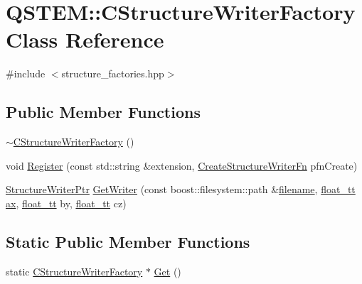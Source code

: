\hypertarget{class_q_s_t_e_m_1_1_c_structure_writer_factory}{\section{Q\-S\-T\-E\-M\-:\-:C\-Structure\-Writer\-Factory Class Reference}
\label{class_q_s_t_e_m_1_1_c_structure_writer_factory}
}


{\ttfamily \#include $<$structure\-\_\-factories.\-hpp$>$}

\subsection*{Public Member Functions}
\begin{DoxyCompactItemize}
\item 
\hyperlink{class_q_s_t_e_m_1_1_c_structure_writer_factory_aabc542066e3b68fdd08f8a4c9e3b9f5f}{$\sim$\-C\-Structure\-Writer\-Factory} ()
\item 
void \hyperlink{class_q_s_t_e_m_1_1_c_structure_writer_factory_a2e5f3cba95019c6fffe68e8e939c285b}{Register} (const std\-::string \&extension, \hyperlink{namespace_q_s_t_e_m_a410415444cab11e6e82ba838bacc0ca4}{Create\-Structure\-Writer\-Fn} pfn\-Create)
\item 
\hyperlink{namespace_q_s_t_e_m_abd9ebd39703fa5559b437aa35900ef5c}{Structure\-Writer\-Ptr} \hyperlink{class_q_s_t_e_m_1_1_c_structure_writer_factory_a02068c5cbaa9e7a48f614d42d5da4803}{Get\-Writer} (const boost\-::filesystem\-::path \&\hyperlink{write_fields2_file_8m_af3723aa817dbb65282d5e1db81f08ad8}{filename}, \hyperlink{namespace_q_s_t_e_m_a915d7caa497280d9f927c4ce8d330e47}{float\-\_\-tt} \hyperlink{image_sim_8m_a8fa675eb2fcec5b95d9d21c670da7f30}{ax}, \hyperlink{namespace_q_s_t_e_m_a915d7caa497280d9f927c4ce8d330e47}{float\-\_\-tt} by, \hyperlink{namespace_q_s_t_e_m_a915d7caa497280d9f927c4ce8d330e47}{float\-\_\-tt} cz)
\end{DoxyCompactItemize}
\subsection*{Static Public Member Functions}
\begin{DoxyCompactItemize}
\item 
static \hyperlink{class_q_s_t_e_m_1_1_c_structure_writer_factory}{C\-Structure\-Writer\-Factory} $\ast$ \hyperlink{class_q_s_t_e_m_1_1_c_structure_writer_factory_ab56450896d627ce0d1bded59e6430eba}{Get} ()
\end{DoxyCompactItemize}


